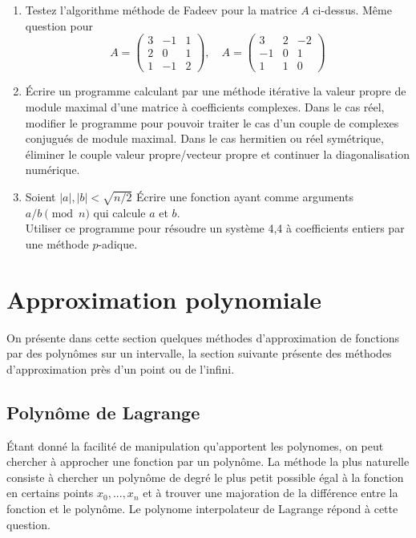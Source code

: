 \documentclass[a4paper,11pt]{article}
\begin{document}
\begin{giacjshere}
\begin{enumerate}
des 1 ailleurs.
\'Ecrire un programme mettant en oeuvre cette recherche, testez-le avec
une matrice al\'eatoire de taille 30.
\item Testez l'algorithme méthode de Fadeev pour la matrice $A$ ci-dessus.
Même question pour 
\[ A=\left(\begin{array}{ccc}
 3 & -1 & 1 \\
2 &0 &1 \\
1 & -1 & 2 
\end{array}\right), \quad 
A=\left(\begin{array}{ccc}
 3 & 2 & -2 \\
-1 &0 &1 \\
1 & 1 & 0 
\end{array}\right) 
 \]
\item \'Ecrire un programme calculant par une méthode itérative
la valeur propre de module maximal d'une matrice à coefficients
complexes. Dans le cas réel, modifier le programme pour pouvoir
traiter le cas d'un couple de complexes conjugués de module maximal.
Dans le cas hermitien ou réel symétrique, éliminer le couple valeur
propre/vecteur propre et continuer la diagonalisation numérique.
\item Soient $|a|,|b|<\sqrt{n/2}$
\'Ecrire une fonction ayant comme arguments $a/b \pmod n$ 
qui calcule $a$ et $b$.\\
Utiliser ce programme pour résoudre un système 4,4 à coefficients entiers
par une méthode $p$-adique.
\end{enumerate}

\pagebreak


\section{Approximation polynomiale} \label{sec:interp}
On présente dans cette section quelques méthodes d'approximation
de fonctions par des polynômes sur un intervalle, la section suivante 
présente des méthodes d'approximation près d'un point ou de l'infini.

\subsection{Polyn\^ome de Lagrange} 
\'Etant donn\'e la facilit\'e de manipulation qu'apportent les
polynomes, on peut chercher \`a approcher une fonction par un
polyn\^ome. La m\'ethode la plus naturelle consiste \`a chercher
un polyn\^ome de degr\'e le plus petit possible
\'egal \`a la fonction en certains points $x_0,...,x_n$
et \`a trouver une majoration de la diff\'erence entre la fonction
et le polyn\^ome.
Le polynome interpolateur de Lagrange r\'epond \`a cette question.


\end{giacjshere}
\end{document}
